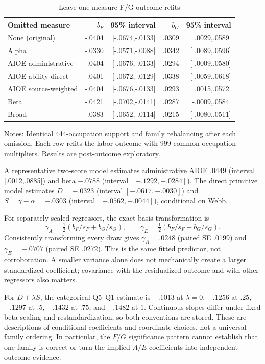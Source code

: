 \begin{table}[htbp]
\centering
\caption{Leave-one-measure F/G outcome refits}\label{tab:appfgloo}
\scriptsize
\begin{threeparttable}
\begin{tabular}{lrrrr}
\toprule
Omitted measure & $b_F$ & 95\% interval & $b_G$ & 95\% interval\\
\midrule
None (original)&-.0404&[-.0674,-.0133]& .0309&[ .0029,.0589]\\
Alpha&-.0330&[-.0571,-.0088]& .0342&[ .0089,.0596]\\
AIOE administrative&-.0404&[-.0676,-.0133]& .0294&[ .0009,.0580]\\
AIOE ability-direct&-.0401&[-.0672,-.0129]& .0338&[ .0059,.0618]\\
AIOE source-weighted&-.0404&[-.0676,-.0133]& .0293&[ .0015,.0572]\\
Beta&-.0421&[-.0702,-.0141]& .0287&[-.0009,.0584]\\
Broad&-.0383&[-.0652,-.0114]& .0215&[-.0080,.0511]\\
\bottomrule
\end{tabular}
\begin{tablenotes}[flushleft]\footnotesize
\item Notes: Identical 444-occupation support and family rebalancing after each omission. Each row refits the labor outcome with 999 common occupation multipliers. Results are post-outcome exploratory.
\end{tablenotes}
\end{threeparttable}
\end{table}

A representative two-score model estimates administrative AIOE .0449 (interval [.0012,.0885]) and beta $-.0788$ (interval $[-.1292,-.0284]$). The direct primitive model estimates $D=-.0323$ (interval $[-.0617,-.0030]$) and $S=\gamma-\alpha=-.0303$ (interval $[-.0562,-.0044]$), conditional on Webb.

For separately scaled regressors, the exact basis transformation is
\[
\gamma_A=\tfrac12(b_F/s_F+b_G/s_G),\qquad
\gamma_E=\tfrac12(b_F/s_F-b_G/s_G).
\]
Consistently transforming every draw gives $\gamma_A=.0248$ (paired SE .0199) and $\gamma_E=-.0707$ (paired SE .0272). This is the same fitted predictor, not corroboration. A smaller variance alone does not mechanically create a larger standardized coefficient; covariance with the residualized outcome and with other regressors also matters.

For $D+\lambda S$, the categorical Q5--Q1 estimate is $-.1013$ at $\lambda=0$, $-.1256$ at $.25$, $-.1297$ at $.5$, $-.1432$ at $.75$, and $-.1482$ at $1$. Continuous slopes differ under fixed beta scaling and restandardization, so both conventions are stored. These are descriptions of conditional coefficients and coordinate choices, not a universal family ordering. In particular, the $F/G$ significance pattern cannot establish that one family is correct or turn the implied $A/E$ coefficients into independent outcome evidence.
\FloatBarrier
